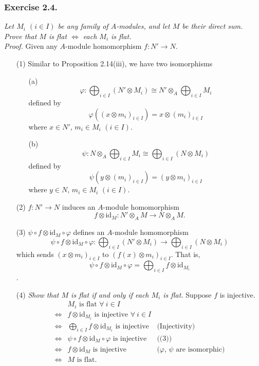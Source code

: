 \documentclass{article}
\begin{document}



\subsubsection*{Exercise 2.4.}
\emph{Let $M_i$ $(i \in I)$ be any family of $A$-modules,
and let $M$ be their direct sum.
Prove that $M$ is flat $\Leftrightarrow$ each $M_i$ is flat.} \\



\emph{Proof.}
Given any $A$-module homomorphism $f: N' \to N$.
\begin{enumerate}
\item[(1)]
Similar to Proposition 2.14(iii), we have
two isomorphisms
  \begin{enumerate}
  \item[(a)]
  $$\varphi:
  \bigoplus_{i \in I} (N' \otimes M_i)
  \cong
  N' \otimes_A \bigoplus_{i \in I} M_i$$
  defined by
  $$\varphi((x \otimes m_i)_{i \in I}) = x \otimes (m_i)_{i \in I}$$
  where $x \in N'$, $m_i \in M_i$ $(i \in I)$.
  \item[(b)]
  $$\psi:
  N \otimes_A \bigoplus_{i \in I} M_i
  \cong
  \bigoplus_{i \in I} (N \otimes M_i)$$
  defined by
  $$\psi(y \otimes (m_i)_{i \in I}) = (y \otimes m_i)_{i \in I}$$
  where $y \in N$, $m_i \in M_i$ $(i \in I)$.
  \end{enumerate}
\item[(2)]
$f: N' \to N$ induces an $A$-module homomorphism
$$f \otimes \text{id}_{M}: N' \otimes_A M \to N \otimes_A M.$$
\item[(3)]
$\psi \circ f \otimes \text{id}_{M} \circ \varphi$ defines an $A$-module homomorphism
$$\psi \circ f \otimes \text{id}_{M} \circ \varphi:
\bigoplus_{i \in I} (N' \otimes M_i) \to \bigoplus_{i \in I} (N \otimes M_i)$$
which sends $(x \otimes m_i)_{i \in I}$ to $(f(x) \otimes m_i)_{i \in I}$.
That is,
$$\psi \circ f \otimes \text{id}_{M} \circ \varphi
= \bigoplus_{i \in I} f \otimes \text{id}_{M_i}$$.
\item[(4)]
\emph{Show that $M$ is flat if and only if each $M_i$ is flat.}
Suppose $f$ is injective.
\begin{align*}
&\text{$M_i$ is flat $\forall \: i \in I$} \\
\Longleftrightarrow&
\text{$f \otimes \text{id}_{M_i}$ is injective $\forall \: i \in I$} \\
\Longleftrightarrow&
\text{$\bigoplus_{i \in I} f \otimes \text{id}_{M_i}$ is injective}
  &\text{(Injectivity)} \\
\Longleftrightarrow&
\text{$\psi \circ f \otimes \text{id}_{M} \circ \varphi$ is injective}
  &\text{((3))} \\
\Longleftrightarrow&
\text{$f \otimes \text{id}_{M}$ is injective}
  &\text{($\varphi$, $\psi$ are isomorphic)} \\
\Longleftrightarrow&
\text{$M$ is flat.}
\end{align*}
\end{enumerate}
\end{document}
